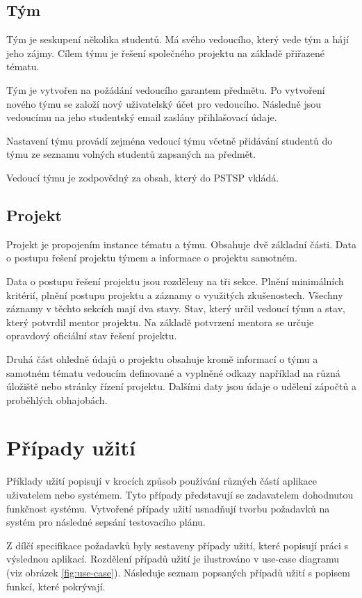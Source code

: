 \documentclass[czech,BP]{thesiskiv}
\begin{document}
		\subsection{Tým}
		\par Tým je seskupení několika studentů. Má svého vedoucího, který vede tým a hájí jeho zájmy. Cílem týmu je řešení společného projektu na základě přiřazené tématu.
		\par Tým je vytvořen na požádání vedoucího garantem předmětu. Po vytvoření nového týmu se založí nový uživatelský účet pro vedoucího. Následně jsou vedoucímu na jeho studentský email zaslány přihlašovací údaje.
		\par Nastavení týmu provádí zejména vedoucí týmu včetně přidávání studentů do týmu ze seznamu volných studentů zapsaných na předmět.
		\par Vedoucí týmu je zodpovědný za obsah, který do PSTSP vkládá.
		\subsection{Projekt}
		\par Projekt je propojením instance tématu a týmu. Obsahuje dvě základní části. Data o postupu řešení projektu týmem a informace o projektu samotném. 
		\par Data o postupu řešení projektu jsou rozděleny na tři sekce. Plnění minimálních kritérií, plnění postupu projektu a záznamy o využitých zkušenostech. Všechny záznamy v těchto sekcích mají dva stavy. Stav, který určil vedoucí týmu a stav, který potvrdil mentor projektu. Na základě potvrzení mentora se určuje opravdový oficiální stav řešení projektu.
		\par Druhá část ohledně údajů o projektu obsahuje kromě informací o týmu a samotném tématu vedoucím definované a vyplněné odkazy například na různá úložiště nebo stránky řízení projektu. Dalšími daty jsou údaje o udělení zápočtů a proběhlých obhajobách.
	\section{Případy užití}
		\par Příklady užití popisují v krocích způsob používání různých částí aplikace uživatelem nebo systémem. Tyto případy představují se zadavatelem dohodnutou funkčnost systému. Vytvořené případy užití usnadňují tvorbu požadavků na systém pro následné sepsání testovacího plánu.
		\par Z dílčí specifikace požadavků byly sestaveny případy užití, které popisují práci s výslednou aplikací. Rozdělení případů užití je ilustrováno v use-case diagramu (viz obrázek \ref{fig:use-case}). Následuje seznam popsaných případů užití s popisem funkcí, které pokrývají.
\end{document}
